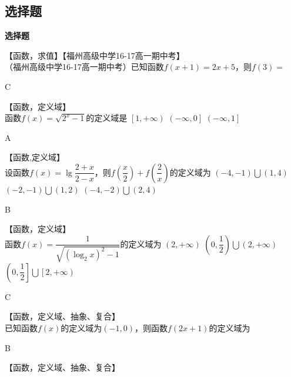   \subsection{选择题}
  \begin{exercise}{\bf 选择题}
    \item 【函数，求值】【福州高级中学16-17高一期中考】\\
      （福州高级中学16-17高一期中考）已知函数$f(x+1)=2x+5$，则$f(3)=$\xz
      \begin{answer}
        C
      \end{answer}
    \item 【函数，定义域】\\
      函数$f(x)=\sqrt{2^x-1}$的定义域是\xz
      \xx{$ \left[0,+\infty\right)$}
       {$ \left[1,+\infty\right)$}
       {$ \left(-\infty,0\right]$}
       {$ \left(-\infty,1\right]$}
      \begin{answer}
        A
      \end{answer}
    \item 【函数,定义域】\\
      设函数$f(x)=\lg \dfrac{2+x}{2-x}$，则$ f\left(\dfrac{x}{2}\right)+f\left(\dfrac{2}{x}\right) $的定义域为\xz
       {$\left(-4,-1\right)\bigcup \left(1,4\right) $}
       {$ \left(-2,-1\right)\bigcup \left(1,2\right)$}
       {$ \left(-4,-2\right)\bigcup \left(2,4\right)$}
      \begin{answer}
        B
      \end{answer}
    \item 【函数，定义域】\\
      函数$f(x)=\dfrac{1}{\sqrt{\left(\log_2x\right)^2-1}}$的定义域为\xz
       {$ \left(2,+\infty\right)$}
       {$ \left(0,\dfrac{1}{2}\right)\bigcup\left(2,+\infty\right)$}
       {$ \left(0,\dfrac{1}{2}\right]\bigcup\left[2,+\infty\right)$}
      \begin{answer}
        C
      \end{answer}
    \item 【函数，定义域、抽象、复合】\\
      已知函数$f(x)$的定义域为$(-1,0)$，则函数$f(2x+1)$的定义域为\xz
      \begin{answer}
        B
      \end{answer}
    \item 【函数，定义域、抽象、复合】\\

\end{exercise}
